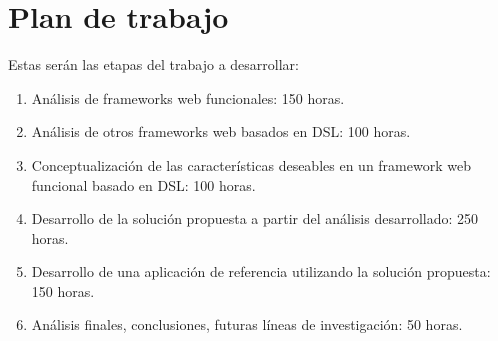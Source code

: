 \documentclass[12pt]{article}
\begin{document}
\section{Plan de trabajo}

Estas serán las etapas del trabajo a desarrollar:

\begin{enumerate}
	\item Análisis de frameworks web funcionales: 150 horas.
	\item Análisis de otros frameworks web basados en DSL: 100 horas.
	\item Conceptualización de las características deseables en un framework web funcional basado en DSL: 100 horas.
	\item Desarrollo de la solución propuesta a partir del análisis desarrollado: 250 horas.
	\item Desarrollo de una aplicación de referencia utilizando la solución propuesta: 150 horas.
	\item Análisis finales, conclusiones, futuras líneas de investigación: 50 horas.
\end{enumerate}

\printglossaries



\end{document}
